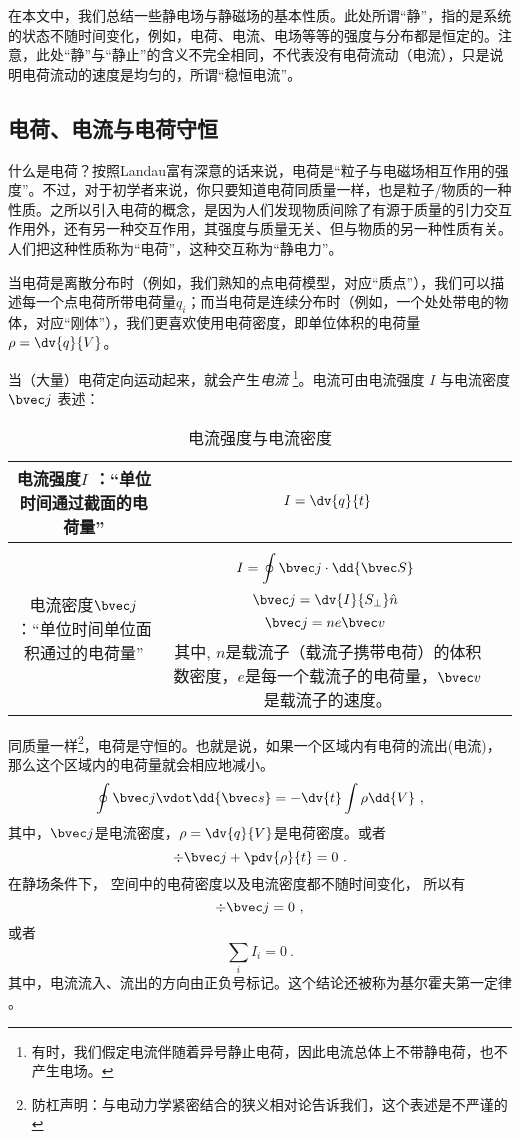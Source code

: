 
\begin{issues}
\issueDraft
\end{issues}
在本文中，我们总结一些静电场与静磁场的基本性质。此处所谓“静”，指的是系统的状态不随时间变化，例如，电荷、电流、电场等等的强度与分布都是恒定的。注意，此处“静”与“静止”的含义不完全相同，不代表没有电荷流动（电流），只是说明电荷流动的速度是均匀的，所谓“稳恒电流”。

\subsection{电荷、电流与电荷守恒}
什么是电荷？按照Landau富有深意的话来说，电荷是“粒子与电磁场相互作用的强度”。不过，对于初学者来说，你只要知道电荷同质量一样，也是粒子/物质的一种性质。之所以引入电荷的概念，是因为人们发现物质间除了有源于质量的引力交互作用外，还有另一种交互作用，其强度与质量无关、但与物质的另一种性质有关。人们把这种性质称为“电荷”，这种交互称为“静电力”。

当电荷是离散分布时（例如，我们熟知的点电荷模型，对应“质点”），我们可以描述每一个点电荷所带电荷量$q_i$；而当电荷是连续分布时（例如，一个处处带电的物体，对应“刚体”），我们更喜欢使用电荷密度，即单位体积的电荷量$\rho = \dv{q}{V}$。

当（大量）电荷定向运动起来，就会产生\textsl{电流} \footnote{有时，我们假定电流伴随着异号静止电荷，因此电流总体上不带静电荷，也不产生电场。}。电流可由电流强度 $I$ 与电流密度 $\bvec j$ 表述：

\begin{table}[ht]
\centering
\caption{电流强度与电流密度}\label{tab_estfid3}
\begin{tabular}{|c|c|c|}
\hline
电流强度$I$ ：“单位时间通过截面的电荷量” & $I = \dv{q}{t}$ \\
\hline
电流密度$\bvec j$ ：“单位时间单位面积通过的电荷量” & $$I = \oint \bvec j \cdot \dd {\bvec S}~$$ $$\bvec j= \dv{I}{S_\perp} \hat n~$$ $$\bvec j = n e \bvec v~$$其中, $n$是载流子（载流子携带电荷）的体积数密度，$e$是每一个载流子的电荷量，$\bvec v$是载流子的速度。 \\
\hline
\end{tabular}
\end{table}


同质量一样\footnote{防杠声明：与电动力学紧密结合的狭义相对论告诉我们，这个表述是不严谨的}，电荷是守恒的。也就是说，如果一个区域内有电荷的流出(电流)，那么这个区域内的电荷量就会相应地减小。
$$
\oint \bvec j \vdot \dd{\bvec s}  =  - \dv{t} \int \rho \dd{V}~,
$$
其中，$\bvec j$是电流密度，$\rho = \dv{q}{V}$是电荷密度。或者
$$
\div \bvec j + \pdv{\rho}{t} = 0~.
$$
在静场条件下， 空间中的电荷密度以及电流密度都不随时间变化， 所以有
$$
\div \bvec j = 0~,
$$
或者
$$\sum_i I_i = 0~.$$
其中，电流流入、流出的方向由正负号标记。这个结论还被称为基尔霍夫第一定律 。


